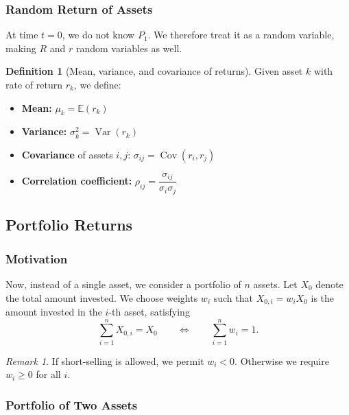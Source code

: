 \documentclass[12pt, a4paper]{article}
\theoremstyle{plain}
\theoremstyle{definition}
\newtheorem{definition}[theorem]{Definition}
\theoremstyle{remark}
\newtheorem{remark}[theorem]{Remark}
\begin{document}
\subsubsection{Random Return of Assets}

At time $t=0$, we do not know $P_1$. We therefore treat it as a random variable, making $R$ and $r$ random variables as well.

\begin{definition}[Mean, variance, and covariance of returns]
  Given asset $k$ with rate of return $r_k$, we define:
  \begin{itemize}
    \item \textbf{Mean:} $\mu_k = \mathbb{E}(r_k)$
    \item \textbf{Variance:} $\sigma_k^2 = \operatorname{Var}(r_k)$
    \item \textbf{Covariance} of assets $i,j$: $\sigma_{ij} = \operatorname{Cov}(r_i, r_j)$
    \item \textbf{Correlation coefficient:} $\rho_{ij} = \dfrac{\sigma_{ij}}{\sigma_i \sigma_j}$
  \end{itemize}
\end{definition}

\subsection{Portfolio Returns}

\subsubsection*{Motivation}

Now, instead of a single asset, we consider a portfolio of $n$ assets. Let $X_0$ denote the total amount invested. We choose weights $w_i$ such that $X_{0,i} = w_i X_0$ is the amount invested in the $i$-th asset, satisfying
\[
  \sum_{i=1}^n X_{0,i} = X_0 \qquad \Longleftrightarrow \qquad \sum_{i=1}^n w_i = 1.
\]

\begin{remark}
  If short-selling is allowed, we permit $w_i < 0$. Otherwise we require $w_i \geq 0$ for all $i$.
\end{remark}

\subsubsection{Portfolio of Two Assets}
\end{document}
